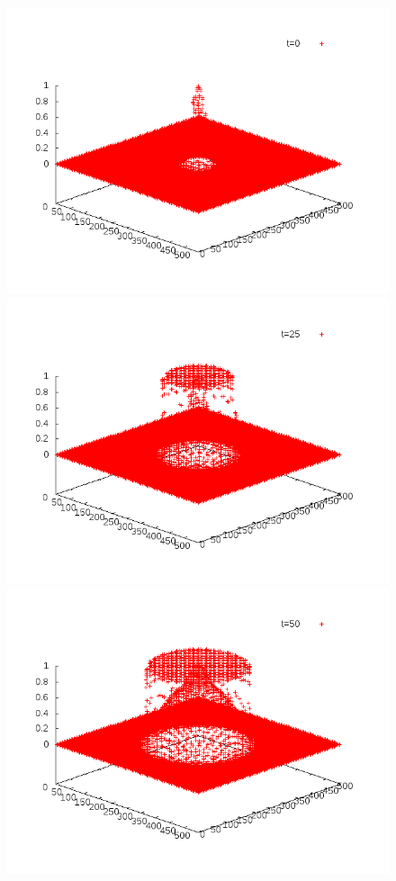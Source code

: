 \documentclass{article}
\begin{document}
\begin{figure}[!h]
\centering
	\includegraphics[scale=0.25]{img/anim2-10-1.png}
	\includegraphics[scale=0.25]{img/anim2-10-50.png}\\
	\includegraphics[scale=0.25]{img/anim2-10-100.png}

\end{figure}
\end{document}
